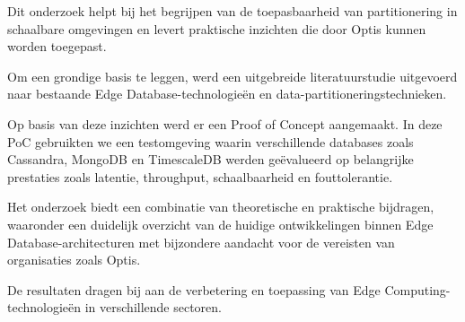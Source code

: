 Dit onderzoek helpt bij het begrijpen van de toepasbaarheid van partitionering in schaalbare omgevingen en levert praktische inzichten die door Optis kunnen worden toegepast.

Om een grondige basis te leggen, werd een uitgebreide literatuurstudie uitgevoerd naar bestaande Edge Database-technologieën en data-partitioneringstechnieken.

Op basis van deze inzichten werd er een Proof of Concept aangemaakt. In deze PoC gebruikten we een testomgeving waarin verschillende databases zoals Cassandra, MongoDB en TimescaleDB werden geëvalueerd op belangrijke prestaties zoals latentie, throughput, schaalbaarheid en fouttolerantie.

Het onderzoek biedt een combinatie van theoretische en praktische bijdragen, waaronder een duidelijk overzicht van de huidige ontwikkelingen binnen Edge Database-architecturen met bijzondere aandacht voor de vereisten van organisaties zoals Optis.

De resultaten dragen bij aan de verbetering en toepassing van Edge Computing-technologieën in verschillende sectoren.